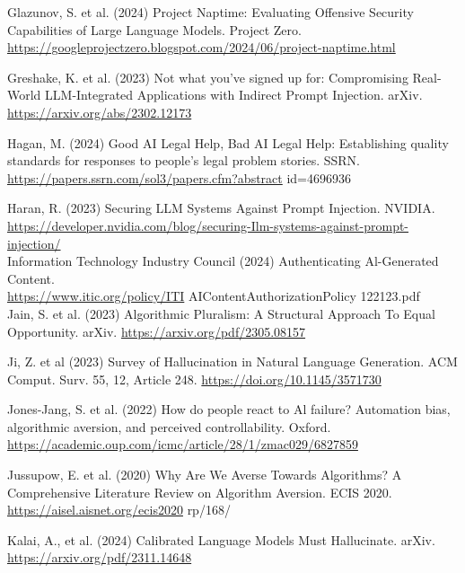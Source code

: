 \documentclass[10pt]{article}
\begin{document}
Glazunov, S. et al. (2024) Project Naptime: Evaluating Offensive Security Capabilities of Large Language Models. Project Zero. \href{https://googleprojectzero.blogspot.com/2024/06/project-naptime.html}{https://googleprojectzero.blogspot.com/2024/06/project-naptime.html}

Greshake, K. et al. (2023) Not what you've signed up for: Compromising Real-World LLM-Integrated Applications with Indirect Prompt Injection. arXiv. \href{https://arxiv.org/abs/2302.12173}{https://arxiv.org/abs/2302.12173}

Hagan, M. (2024) Good AI Legal Help, Bad AI Legal Help: Establishing quality standards for responses to people's legal problem stories. SSRN. \href{https://papers.ssrn.com/sol3/papers.cfm?abstract}{https://papers.ssrn.com/sol3/papers.cfm?abstract} id=4696936

Haran, R. (2023) Securing LLM Systems Against Prompt Injection. NVIDIA.\\
\href{https://developer.nvidia.com/blog/securing-Ilm-systems-against-prompt-injection/}{https://developer.nvidia.com/blog/securing-Ilm-systems-against-prompt-injection/}\\
Information Technology Industry Council (2024) Authenticating Al-Generated Content.\\
\href{https://www.itic.org/policy/ITI}{https://www.itic.org/policy/ITI} AIContentAuthorizationPolicy 122123.pdf\\
Jain, S. et al. (2023) Algorithmic Pluralism: A Structural Approach To Equal Opportunity. arXiv. \href{https://arxiv.org/pdf/2305.08157}{https://arxiv.org/pdf/2305.08157}

Ji, Z. et al (2023) Survey of Hallucination in Natural Language Generation. ACM Comput. Surv. 55, 12, Article 248. \href{https://doi.org/10.1145/3571730}{https://doi.org/10.1145/3571730}

Jones-Jang, S. et al. (2022) How do people react to Al failure? Automation bias, algorithmic aversion, and perceived controllability. Oxford. \href{https://academic.oup.com/icmc/article/28/1/zmac029/6827859}{https://academic.oup.com/icmc/article/28/1/zmac029/6827859}

Jussupow, E. et al. (2020) Why Are We Averse Towards Algorithms? A Comprehensive Literature Review on Algorithm Aversion. ECIS 2020. \href{https://aisel.aisnet.org/ecis2020}{https://aisel.aisnet.org/ecis2020} rp/168/

Kalai, A., et al. (2024) Calibrated Language Models Must Hallucinate. arXiv.\\
\href{https://arxiv.org/pdf/2311.14648}{https://arxiv.org/pdf/2311.14648}
\end{document}
